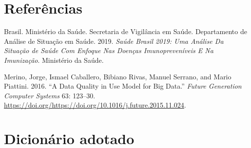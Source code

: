 \documentclass[
  12,
  table]{proadi}
\begin{document}
\newpage

\hypertarget{referuxeancias}{%
\section{Referências}\label{referuxeancias}}

\hypertarget{refs}{}
\leavevmode\hypertarget{ref-brasil2019}{}%
Brasil. Ministério da Saúde. Secretaria de Vigilância em Saúde.
Departamento de Análise de Situação em Saúde. 2019. \emph{Saúde Brasil
2019: Uma Análise Da Situação de Saúde Com Enfoque Nas Doenças
Imunopreveníveis E Na Imunização}. Ministério da Saúde.

\leavevmode\hypertarget{ref-merino}{}%
Merino, Jorge, Ismael Caballero, Bibiano Rivas, Manuel Serrano, and
Mario Piattini. 2016. ``A Data Quality in Use Model for Big Data.''
\emph{Future Generation Computer Systems} 63: 123--30.
\url{https://doi.org/https://doi.org/10.1016/j.future.2015.11.024}.

\captionsetup[table]{labelformat=empty}

\newpage

\hypertarget{dicionuxe1rio-adotado}{%
\section*{Dicionário adotado}\label{dicionuxe1rio-adotado}}

\begingroup\fontsize{10}{12}\selectfont
\end{document}
